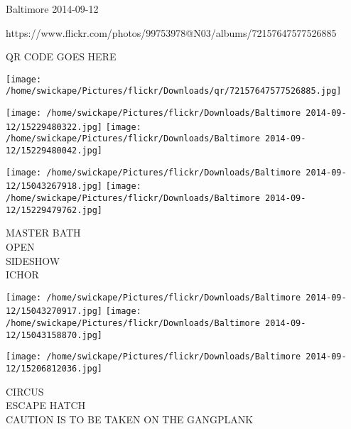 \documentclass[10pt,letterpaper]{article}
\begin{document}
Baltimore 2014-09-12

https://www.flickr.com/photos/99753978@N03/albums/72157647577526885

QR CODE GOES HERE

\texttt{[image: /home/swickape/Pictures/flickr/Downloads/qr/72157647577526885.jpg]}
\pagebreak

\texttt{[image: /home/swickape/Pictures/flickr/Downloads/Baltimore 2014-09-12/15229480322.jpg]}
\texttt{[image: /home/swickape/Pictures/flickr/Downloads/Baltimore 2014-09-12/15229480042.jpg]}

\texttt{[image: /home/swickape/Pictures/flickr/Downloads/Baltimore 2014-09-12/15043267918.jpg]}
\texttt{[image: /home/swickape/Pictures/flickr/Downloads/Baltimore 2014-09-12/15229479762.jpg]}

MASTER BATH\\
OPEN\\
SIDESHOW\\
ICHOR\\
\pagebreak

\texttt{[image: /home/swickape/Pictures/flickr/Downloads/Baltimore 2014-09-12/15043270917.jpg]}
\texttt{[image: /home/swickape/Pictures/flickr/Downloads/Baltimore 2014-09-12/15043158870.jpg]}

\texttt{[image: /home/swickape/Pictures/flickr/Downloads/Baltimore 2014-09-12/15206812036.jpg]}

CIRCUS\\
ESCAPE HATCH\\
CAUTION IS TO BE TAKEN ON THE GANGPLANK\\
\pagebreak
\end{document}
